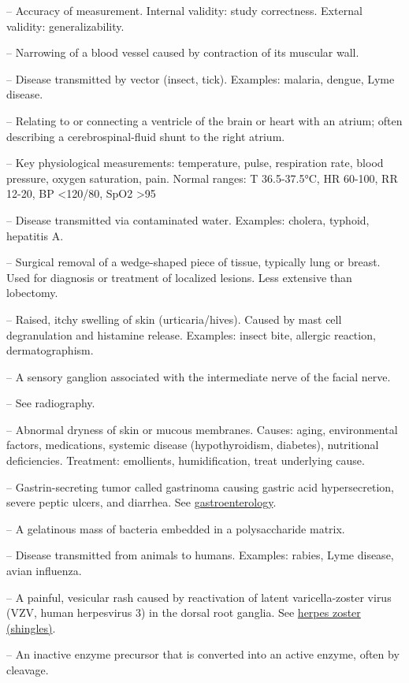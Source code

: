 -- Accuracy of measurement. Internal validity: study correctness. External validity: generalizability.

-- Narrowing of a blood vessel caused by contraction of its muscular wall.

-- Disease transmitted by vector (insect, tick). Examples: malaria, dengue, Lyme disease.

-- Relating to or connecting a ventricle of the brain or heart with an atrium; often describing a cerebrospinal-fluid shunt to the right atrium.

-- Key physiological measurements: temperature, pulse, respiration rate, blood pressure, oxygen saturation, pain. Normal ranges: T 36.5-37.5°C, HR 60-100, RR 12-20, BP <120/80, SpO2 >95%

-- Disease transmitted via contaminated water. Examples: cholera, typhoid, hepatitis A.

-- Surgical removal of a wedge-shaped piece of tissue, typically lung or breast. Used for diagnosis or treatment of localized lesions. Less extensive than lobectomy.

-- Raised, itchy swelling of skin (urticaria/hives). Caused by mast cell degranulation and histamine release. Examples: insect bite, allergic reaction, dermatographism.

-- A sensory ganglion associated with the intermediate nerve of the facial nerve.

-- See radiography.

-- Abnormal dryness of skin or mucous membranes. Causes: aging, environmental factors, medications, systemic disease (hypothyroidism, diabetes), nutritional deficiencies. Treatment: emollients, humidification, treat underlying cause.

-- Gastrin-secreting tumor called gastrinoma causing gastric acid hypersecretion, severe peptic ulcers, and diarrhea. See \hyperlink{Gastroenterology}{gastroenterology}.

-- A gelatinous mass of bacteria embedded in a polysaccharide matrix.

-- Disease transmitted from animals to humans. Examples: rabies, Lyme disease, avian influenza.

-- A painful, vesicular rash caused by reactivation of latent varicella-zoster virus (VZV, human herpesvirus 3) in the dorsal root ganglia. See \hyperlink{Herpes Zoster (Shingles)}{herpes zoster (shingles)}.

-- An inactive enzyme precursor that is converted into an active enzyme, often by cleavage.
